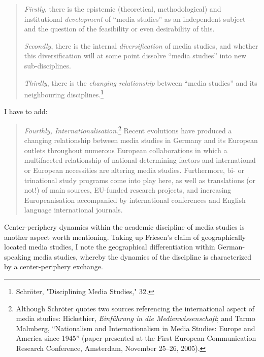 \documentclass{tufte-handout}
\begin{document}
\begin{quote}
\emph{Firstly}, there is the epistemic (theoretical, methodological) and
institutional \emph{development} of ``media studies'' as an independent
subject -- and the question of the feasibility or even desirability of
this.

\emph{Secondly}, there is the internal \emph{diversification} of media
studies, and whether this diversification will at some point dissolve
``media studies'' into new sub-disciplines.

\emph{Thirdly}, there is the \emph{changing relationship} between
``media studies'' and its neighbouring disciplines.\footnote{Schröter,
  "Disciplining Media Studies," 32.}
\end{quote}

I have to add:

\begin{quote}
\emph{Fourthly, Internationalisation}.\footnote{Although Schröter quotes
  two sources referencing the international aspect of media studies:
  Hickethier, \emph{Einführung in die Medienwissenschaft}; and Tarmo
  Malmberg, ``Nationalism and Internationalism in Media Studies: Europe
  and America since 1945'' (paper presented at the First European
  Communication Research Conference, Amsterdam, November 25--26, 2005).}
Recent evolutions have produced a changing relationship between media
studies in Germany and its European outlets throughout numerous European
collaborations in which a multifaceted relationship of national
determining factors and international or European necessities are
altering media studies. Furthermore, bi- or trinational study programs
come into play here, as well as translations (or not!) of main sources,
EU-funded research projects, and increasing Europeanisation accompanied
by international conferences and English language international
journals.
\end{quote}

Center-periphery dynamics within the academic discipline of media
studies is another aspect worth mentioning. Taking up Friesen's claim of
geographically located media studies, I note the geographical
differentiation within German-speaking media studies, whereby the
dynamics of the discipline is characterized by a center-periphery
exchange.
\end{document}
